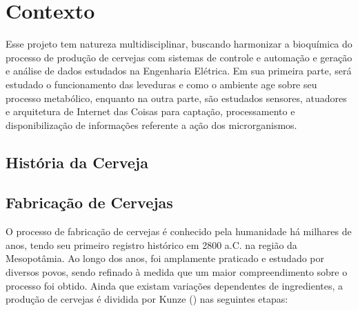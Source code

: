 \chapter{Contexto}

Esse projeto tem natureza multidisciplinar, buscando harmonizar a bioquímica do
processo de produção de cervejas com sistemas de controle e automação e
geração e análise de dados estudados na Engenharia Elétrica. Em sua primeira
parte, será estudado o funcionamento das leveduras e como o ambiente age sobre
seu processo metabólico, enquanto na outra parte, são estudados sensores,
atuadores e arquitetura de Internet das Coisas para captação, processamento e
disponibilização de informações referente a ação dos microrganismos.

\section{História da Cerveja}



\section{Fabricação de Cervejas}

O processo de fabricação de cervejas é conhecido pela 
humanidade há milhares de anos, tendo seu primeiro registro histórico em 2800 a.C.
na região da Mesopotâmia. Ao longo dos anos, foi amplamente praticado e estudado
por diversos povos, sendo refinado à medida que um maior compreendimento sobre
o processo foi obtido. Ainda que existam variações dependentes de ingredientes, a
produção de cervejas é dividida por Kunze () nas seguintes etapas: 

